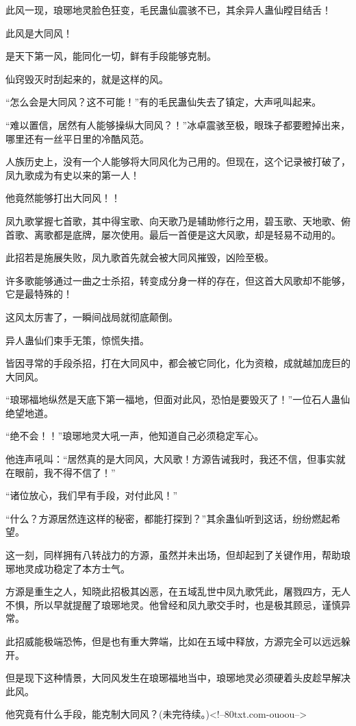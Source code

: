 \begin{this_body}
此风一现，琅琊地灵脸色狂变，毛民蛊仙震骇不已，其余异人蛊仙瞠目结舌！

此风是大同风！

是天下第一风，能同化一切，鲜有手段能够克制。

仙窍毁灭时刮起来的，就是这样的风。

“怎么会是大同风？这不可能！”有的毛民蛊仙失去了镇定，大声吼叫起来。

“难以置信，居然有人能够操纵大同风？！”冰卓震骇至极，眼珠子都要瞪掉出来，哪里还有一丝平日里的冷酷风范。

人族历史上，没有一个人能够将大同风化为己用的。但现在，这个记录被打破了，凤九歌成为有史以来的第一人！

他竟然能够打出大同风！！

凤九歌掌握七首歌，其中得宝歌、向天歌乃是辅助修行之用，碧玉歌、天地歌、俯首歌、离歌都是底牌，屡次使用。最后一首便是这大风歌，却是轻易不动用的。

此招若是施展失败，凤九歌首先就会被大同风摧毁，凶险至极。

许多歌能够通过一曲之士杀招，转变成分身一样的存在，但这首大风歌却不能够，它是最特殊的！

这风太厉害了，一瞬间战局就彻底颠倒。

异人蛊仙们束手无策，惊慌失措。

皆因寻常的手段杀招，打在大同风中，都会被它同化，化为资粮，成就越加庞巨的大同风。

“琅琊福地纵然是天底下第一福地，但面对此风，恐怕是要毁灭了！”一位石人蛊仙绝望地道。

“绝不会！！”琅琊地灵大吼一声，他知道自己必须稳定军心。

他连声吼叫：“居然真的是大同风，大风歌！方源告诫我时，我还不信，但事实就在眼前，我不得不信了！”

“诸位放心，我们早有手段，对付此风！”

“什么？方源居然连这样的秘密，都能打探到？”其余蛊仙听到这话，纷纷燃起希望。

这一刻，同样拥有八转战力的方源，虽然并未出场，但却起到了关键作用，帮助琅琊地灵成功稳定了本方士气。

方源是重生之人，知晓此招极其凶恶，在五域乱世中凤九歌凭此，屠戮四方，无人不惧，所以早就提醒了琅琊地灵。他曾经和凤九歌交手时，也是极其顾忌，谨慎异常。

此招威能极端恐怖，但是也有重大弊端，比如在五域中释放，方源完全可以远远躲开。

但是现下这种情景，大同风发生在琅琊福地当中，琅琊地灵必须硬着头皮趁早解决此风。

他究竟有什么手段，能克制大同风？(未完待续。)<!--80txt.com-ouoou-->

\end{this_body}

